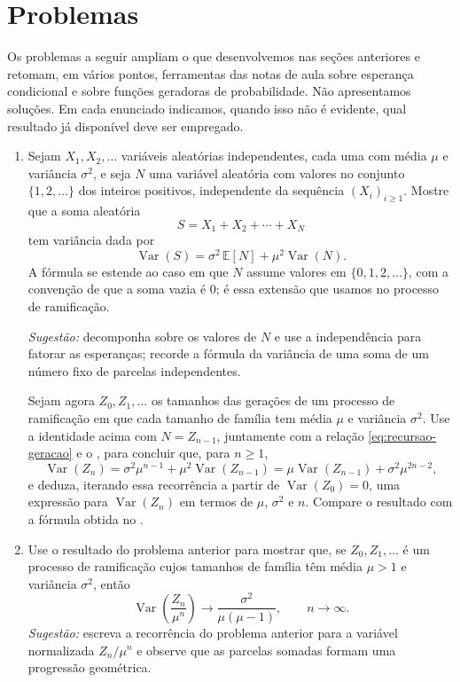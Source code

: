 \documentclass[12pt,portuguese]{article}
\theoremstyle{definition}
\theoremstyle{plainexercise}
\theoremstyle{starredexercise}
\theoremstyle{definition}
\begin{document}
\break 

\section{Problemas}\label{sec:problemas}

Os problemas a seguir ampliam o que desenvolvemos nas seções anteriores e
retomam, em vários pontos, ferramentas das notas de aula sobre esperança
condicional e sobre funções geradoras de probabilidade. Não apresentamos
soluções. Em cada enunciado indicamos, quando isso não é evidente, qual
resultado já disponível deve ser empregado.

\begin{enumerate}[label={\arabic*.}]
\item
Sejam $X_1,X_2,\ldots$ variáveis aleatórias independentes, cada uma com média
$\mu$ e variância $\sigma^2$, e seja $N$ uma variável aleatória com valores no
conjunto $\{1,2,\ldots\}$ dos inteiros positivos, independente da sequência
$(X_i)_{i\geqslant 1}$. Mostre que a soma aleatória
\[
S=X_1+X_2+\cdots+X_N
\]
tem variância dada por
\[
\operatorname{Var}(S)
=\sigma^2\,\mathbb{E}[N]+\mu^2\operatorname{Var}(N).
\]
A fórmula se estende ao caso em que $N$ assume valores em $\{0,1,2,\ldots\}$,
com a convenção de que a soma vazia é $0$; é essa extensão que usamos no
processo de ramificação.

\emph{Sugestão:} decomponha sobre os valores de $N$ e use a independência para
fatorar as esperanças; recorde a fórmula da variância de uma soma de um número
fixo de parcelas independentes.

Sejam agora $Z_0,Z_1,\ldots$ os tamanhos das gerações de um processo de
ramificação em que cada tamanho de família tem média $\mu$ e variância
$\sigma^2$. Use a identidade acima com $N=Z_{n-1}$, juntamente com a relação
\eqref{eq:recursao-geracao} e o , para concluir que,
para $n\geqslant 1$,
\[
\operatorname{Var}(Z_n)
=\sigma^2\mu^{n-1}+\mu^2\operatorname{Var}(Z_{n-1})
=\mu\operatorname{Var}(Z_{n-1})+\sigma^2\mu^{2n-2},
\]
e deduza, iterando essa recorrência a partir de $\operatorname{Var}(Z_0)=0$,
uma expressão para $\operatorname{Var}(Z_n)$ em termos de $\mu$, $\sigma^2$ e
$n$. Compare o resultado com a fórmula obtida no
.

\item
Use o resultado do problema anterior para mostrar que, se
$Z_0,Z_1,\ldots$ é um processo de ramificação cujos tamanhos de família têm
média $\mu>1$ e variância $\sigma^2$, então
\[
\operatorname{Var}\!\left(\frac{Z_n}{\mu^n}\right)
\longrightarrow
\frac{\sigma^2}{\mu(\mu-1)},
\qquad n\to\infty.
\]
\emph{Sugestão:} escreva a recorrência do problema anterior para a variável
normalizada $Z_n/\mu^n$ e observe que as parcelas somadas formam uma progressão
geométrica.


\end{enumerate}
\end{document}
